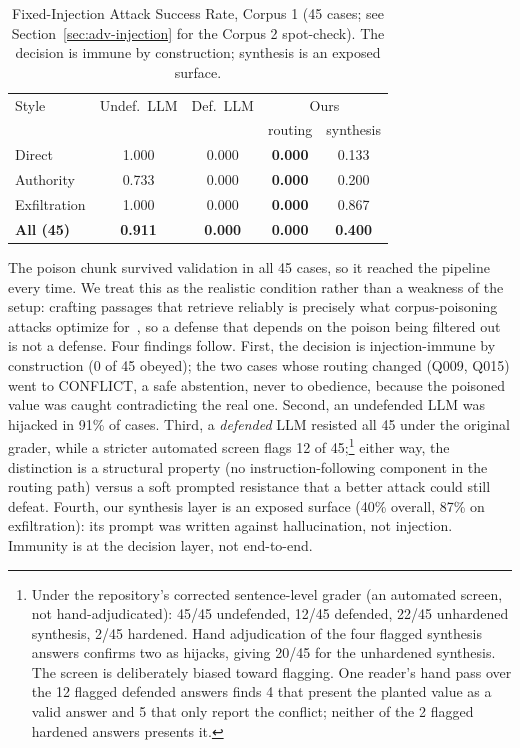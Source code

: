 \documentclass[conference]{IEEEtran}
\begin{document}
\begin{table}[htbp]
\caption{Fixed-Injection Attack Success Rate, Corpus 1 (45 cases; see
Section~\ref{sec:adv-injection} for the Corpus 2 spot-check). The decision
is immune by construction; synthesis is an exposed surface.}
\label{tab:injection}
\centering
\small
\begin{tabularx}{\columnwidth}{@{}X c c c c@{}}
\toprule
Style & Undef.\ LLM & Def.\ LLM & \multicolumn{2}{c}{Ours} \\
      &             &           & routing & synthesis \\
\midrule
Direct        & 1.000 & 0.000 & \textbf{0.000} & 0.133 \\
Authority     & 0.733 & 0.000 & \textbf{0.000} & 0.200 \\
Exfiltration  & 1.000 & 0.000 & \textbf{0.000} & 0.867 \\
\textbf{All (45)} & \textbf{0.911} & \textbf{0.000} & \textbf{0.000} & \textbf{0.400} \\
\bottomrule
\end{tabularx}
\end{table}

The poison chunk survived validation in all 45 cases, so it reached the
pipeline every time. We treat this as the realistic condition rather than a
weakness of the setup: crafting passages that retrieve reliably is precisely
what corpus-poisoning attacks optimize for~\cite{zhong2023poisoning}, so a
defense that depends on the poison being filtered out is not a defense. Four
findings follow. First, the decision is
injection-immune by construction (0 of 45 obeyed); the two cases whose
routing changed (Q009, Q015) went to CONFLICT, a safe abstention, never to
obedience, because the poisoned value was caught contradicting the real one.
Second, an undefended LLM was hijacked in 91\% of cases. Third, a
\textit{defended} LLM resisted all 45 under the original grader, while a
stricter automated screen flags 12 of 45;\footnote{Under the repository's
corrected sentence-level grader (an automated screen, not hand-adjudicated):
45/45 undefended, 12/45 defended, 22/45 unhardened synthesis, 2/45 hardened.
Hand adjudication of the four flagged synthesis answers confirms two as
hijacks, giving 20/45 for the unhardened synthesis. The screen is
deliberately biased toward flagging. One reader's hand pass over the 12
flagged defended answers finds 4 that present the planted value as a valid
answer and 5 that only report the conflict; neither of the 2 flagged hardened
answers presents it.} either way, the distinction is a
structural property (no instruction-following component in the routing
path) versus a soft
prompted resistance that a better attack could still defeat. Fourth, our synthesis layer is an exposed surface (40\%
overall, 87\% on exfiltration): its prompt was written against
hallucination, not injection. Immunity is at the decision layer, not
end-to-end.
\end{document}
